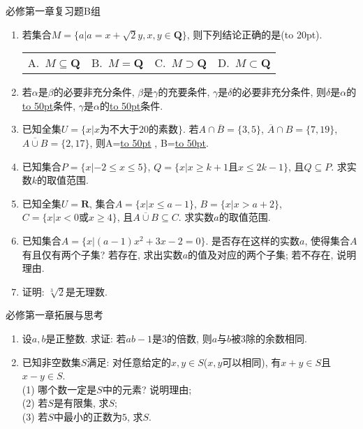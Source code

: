 \documentclass[10pt,a4paper]{article}
\newcommand{\blank}[1]{\underline{\hbox to #1pt{}}}
\newcommand{\bracket}[1]{(\hbox to #1pt{})}
\newcommand{\fourch}[4]{\par\begin{tabular}{p{.23\textwidth}p{.23\textwidth}p{.23\textwidth}p{.23\textwidth}}
A.~#1 &B.~#2& C.~#3& D.~#4
\end{tabular}}
\begin{document}
必修第一章复习题B组
\begin{enumerate}[1.]

\item 若集合$M=\{a|a=x+\sqrt2y, x,y\in \mathbf{Q}\}$, 则下列结论正确的是\bracket{20}.
\fourch{$M\subseteq \mathbf{Q}$}{$M=\mathbf{Q}$}{$M\supset \mathbf{Q}$}{$M\subset \mathbf{Q}$}
\vspace*{3cm}
\item 若$\alpha$是$\beta$的必要非充分条件, $\beta$是$\gamma$的充要条件, $\gamma$是$\delta$的必要非充分条件, 则$\delta$是$\alpha$的\blank{50}条件, $\gamma$是$\alpha$的\blank{50}条件.
\vspace*{3cm}
\item 已知全集$U=\{x|x\text{为不大于}20\text{的素数}\}$. 若$A\cap \overline{B}=\{3, 5\}$, $\overline{A}\cap B=\{7, 19\}$, $\overline{A\cup B}=\{2, 17\}$, 则A=\blank{50} , B=\blank{50}.
\vspace*{3cm}
\item 已知集合$P=\{x|-2\le x\le 5\}$, $Q=\{x|x\ge k+1\text{且}x\le 2k-1\}$, 且$Q\subseteq P$. 求实数$k$的取值范围.
\vspace*{3cm}
\item 已知全集$U=\mathbf{R}$, 集合$A=\{x|x\le a-1\}$, $B=\{x|x>a+2\}$, $C=\{x|x<0\text{或}x\ge 4\}$, 且$\overline{A\cup B}\subseteq C$. 求实数$a$的取值范围.
\vspace*{3cm}
\item 已知集合$A=\{x|(a-1)x^2+3x-2=0\}$. 是否存在这样的实数$a$, 使得集合$A$有且仅有两个子集? 若存在, 求出实数$a$的值及对应的两个子集; 若不存在, 说明理由.
\vspace*{3cm}
\item 证明: $\sqrt[3]{2}$是无理数. 
\vspace*{3cm}
\end{enumerate}

必修第一章拓展与思考
\begin{enumerate}[1.]

\item 设$a,b$是正整数. 求证: 若$ab-1$是$3$的倍数, 则$a$与$b$被$3$除的余数相同.
\vspace*{3cm}
\item 已知非空数集$S$满足: 对任意给定的$x,y\in S$($x,y$可以相同), 有$x+y\in S$且$x-y\in S$.\\
(1) 哪个数一定是$S$中的元素? 说明理由;\\
(2) 若$S$是有限集, 求$S$;\\
(3) 若$S$中最小的正数为$5$, 求$S$.
\vspace*{3cm}
\end{enumerate}
\end{document}
